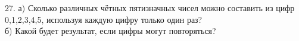 27. а) Сколько различных чётных пятизначных чисел можно составить из цифр 0,1,2,3,4,5, используя каждую цифру только один раз?\\
б) Какой будет результат, если цифры могут повторяться?\\
